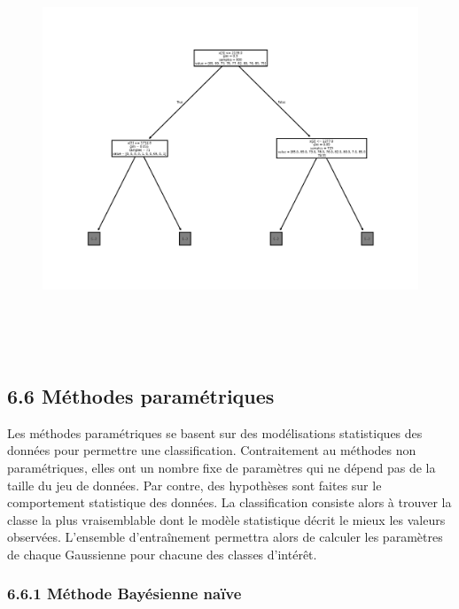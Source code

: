 \documentclass[
]{article}
\begin{document}
\begin{figure}
\centering
\includegraphics[width=6.39583in,height=4.82292in]{05-ClassificationsSupervisees_files/figure-html/cell-40-output-2.png}
\caption{}
\end{figure}

\subsection{\texorpdfstring{{6.6} Méthodes
paramétriques}{6.6 Méthodes paramétriques}}\label{muxe9thodes-paramuxe9triques}

Les méthodes paramétriques se basent sur des modélisations statistiques
des données pour permettre une classification. Contraitement au méthodes
non paramétriques, elles ont un nombre fixe de paramètres qui ne dépend
pas de la taille du jeu de données. Par contre, des hypothèses sont
faites sur le comportement statistique des données. La classification
consiste alors à trouver la classe la plus vraisemblable dont le modèle
statistique décrit le mieux les valeurs observées. L'ensemble
d'entraînement permettra alors de calculer les paramètres de chaque
Gaussienne pour chacune des classes d'intérêt.

\subsubsection{\texorpdfstring{{6.6.1} Méthode Bayésienne
naïve}{6.6.1 Méthode Bayésienne naïve}}\label{muxe9thode-bayuxe9sienne-nauxefve}
\end{document}
